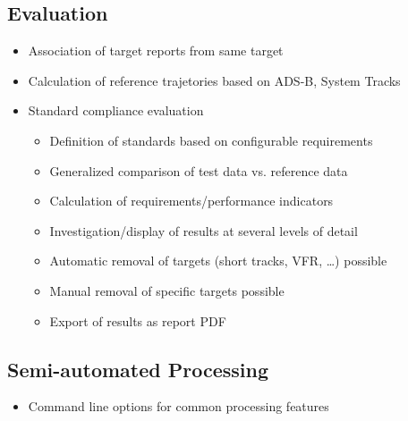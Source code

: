 \subsection{Evaluation}    
\begin{itemize}  
    \item Association of target reports from same target
    \item Calculation of reference trajetories based on ADS-B, System Tracks
    \item Standard compliance evaluation
    \begin{itemize}  
        \item Definition of standards based on configurable requirements
        \item Generalized comparison of test data vs. reference data
        \item Calculation of requirements/performance indicators
        \item Investigation/display of results at several levels of detail
        \item Automatic removal of targets (short tracks, VFR, …) possible
        \item Manual removal of specific targets possible
        \item Export of results as report PDF
    \end{itemize}
\end{itemize}

\subsection{Semi-automated Processing}    
\begin{itemize}  
    \item Command line options for common processing features
\end{itemize}

